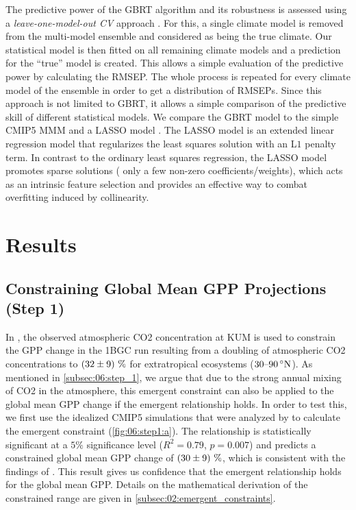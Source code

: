 The predictive power of the \ac{GBRT} algorithm and its robustness is assessed
using a \emph{leave-one-model-out \ac{CV}} approach . For this, a single climate model is
removed from the multi-model ensemble and considered as being the true climate.
Our statistical model is then fitted on all remaining climate models and a
prediction for the \enquote{true} model is created. This allows a simple
evaluation of the predictive power by calculating the \ac{RMSEP}. The whole
process is repeated for every climate model of the ensemble in order to get a
distribution of \acp{RMSEP}. Since this approach is not limited to \ac{GBRT},
it allows a simple comparison of the predictive skill of different statistical
models. We compare the \ac{GBRT} model to the simple \acs{CMIP}5 \acf{MMM} and
a \ac{LASSO} model \autocite{Tibshirani1996}. The \ac{LASSO} model is an
extended linear regression model that regularizes the least squares solution
with an L$1$ penalty term. In contrast to the ordinary least squares
regression, the \ac{LASSO} model promotes sparse solutions (\ie{} only a few
non-zero coefficients/weights), which acts as an intrinsic feature selection
and provides an effective way to combat overfitting induced by collinearity.


\section{Results}
\label{sec:06:results}


\subsection{Constraining Global Mean \acs{GPP} Projections (Step 1)}
\label{subsec:06:results_step1}

In \textcite{Wenzel2016}, the observed atmospheric \ac{CO2} concentration at
\ac{KUM} \autocite{Keeling2005} is used to constrain the \ac{GPP} change in the
\ac{1BGC} run resulting from a doubling of atmospheric \ac{CO2} concentrations
to $\pmrangeunit{32}{9}{\%}$ for extratropical ecosystems
($\rangeunit{30}{90}{\degree N}$). As mentioned in \cref{subsec:06:step_1}, we
argue that due to the strong annual mixing of \ac{CO2} in the atmosphere, this
emergent constraint can also be applied to the global mean \ac{GPP} change if
the emergent relationship holds. In order to test this, we first use the
idealized \acs{CMIP}5 simulations that were analyzed by \textcite{Wenzel2016}
to calculate the emergent constraint (\cref{fig:06:step1:a}). The relationship
is statistically significant at a $5 \unit{\%}$ significance level ($R^2 =
0.79$, $p = 0.007$) and predicts a constrained global mean \acs{GPP} change of
$\pmrangeunit{30}{9}{\%}$, which is consistent with the findings of
\textcite{Wenzel2016}. This result gives us confidence that the emergent
relationship holds for the global mean \ac{GPP}. Details on the mathematical
derivation of the constrained range are given in
\cref{subsec:02:emergent_constraints}.

